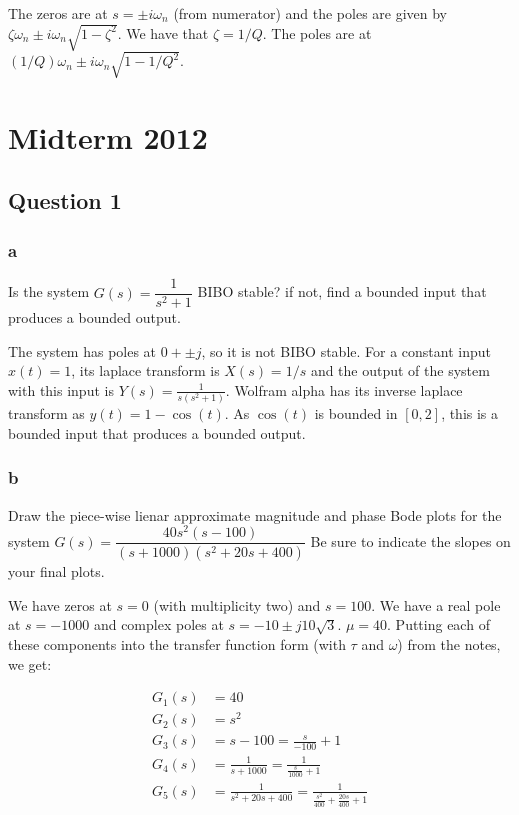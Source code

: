 \documentclass[11pt]{article}
\begin{document}
The zeros are at $s = \pm i \omega_n$ (from numerator) and the poles are given by $\zeta \omega_n \pm i \omega_n \sqrt{1 - \zeta^2}$. We have that $\zeta = 1/Q$. The poles are at $(1/Q) \omega_n \pm i \omega_n \sqrt{1 - 1/Q^2}$.

\section{Midterm 2012}

\subsection{Question 1}

\subsubsection{a}

Is the system $G(s) = \dfrac{1}{s^2 + 1}$ BIBO stable? if not, find a bounded input that produces a bounded output.

The system has poles at $0 + \pm j$, so it is not BIBO stable. For a constant input $x(t) = 1$, its laplace transform is $X(s) = 1/s$ and the output of the system with this input is $Y(s) = \frac{1}{s(s^2 + 1)}$. Wolfram alpha has its inverse laplace transform as $y(t) = 1 - \cos(t)$. As $\cos(t)$ is bounded in $[0, 2]$, this is a bounded input that produces a bounded output.

\subsubsection{b}

Draw the piece-wise lienar approximate magnitude and phase Bode plots for the system $G(s) = \dfrac{40s^2(s - 100)}{(s + 1000)(s^2 + 20s + 400)}$ Be sure to indicate the slopes on your final plots.

We have zeros at $s = 0$ (with multiplicity two) and $s = 100$. We have a real pole at $s = -1000$ and complex poles at $s = -10 \pm j 10 \sqrt{3}$. $\mu = 40$. Putting each of these components into the transfer function form (with $\tau$ and $\omega$) from the notes, we get:

\begin{align*}
    G_1(s) &= 40 \\
    G_2(s) &= s^2 \\
    G_3(s) &= s - 100 = \frac{s}{-100} + 1 \\
    G_4(s) &= \frac{1}{s + 1000} = \frac{1}{\frac{s}{1000} + 1} \\
    G_5(s) &= \frac{1}{s^2 + 20s + 400} = \frac{1}{\frac{s^2}{400} + \frac{20s}{400} + 1} \\
\end{align*}
\end{document}
